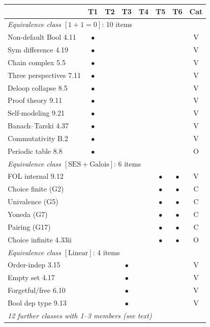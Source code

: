 \begin{center}
\scriptsize
\begin{tabular}{l|cccccc|c}
 & T1 & T2 & T3 & T4 & T5 & T6 & Cat \\
\hline
\multicolumn{8}{l}{\emph{Equivalence class}
  $[1{+}1{=}0]$: 10 items} \\
Non-default Bool 4.11 &
  $\bullet$ & & & & & & V \\
Sym difference 4.19 &
  $\bullet$ & & & & & & V \\
Chain complex 5.5 &
  $\bullet$ & & & & & & V \\
Three perspectives 7.11 &
  $\bullet$ & & & & & & V \\
Deloop collapse 8.5 &
  $\bullet$ & & & & & & V \\
Proof theory 9.11 &
  $\bullet$ & & & & & & V \\
Self-modeling 9.21 &
  $\bullet$ & & & & & & V \\
Banach--Tarski 4.37 &
  $\bullet$ & & & & & & V \\
Commutativity B.2 &
  $\bullet$ & & & & & & V \\
Periodic table 8.8 &
  $\bullet$ & & & & & & O \\[4pt]
\multicolumn{8}{l}{\emph{Equivalence class}
  $[\mathrm{SES} + \mathrm{Galois}]$: 6 items} \\
FOL internal 9.12 &
  & & & & $\bullet$ & $\bullet$ & V \\
Choice finite (G2) &
  & & & & $\bullet$ & $\bullet$ & C \\
Univalence (G5) &
  & & & & $\bullet$ & $\bullet$ & C \\
Yoneda (G7) &
  & & & & $\bullet$ & $\bullet$ & C \\
Pairing (G17) &
  & & & & $\bullet$ & $\bullet$ & C \\
Choice infinite 4.33ii &
  & & & & $\bullet$ & $\bullet$ & O \\[4pt]
\multicolumn{8}{l}{\emph{Equivalence class}
  $[\mathrm{Linear}]$: 4 items} \\
Order-indep 3.15 &
  & & $\bullet$ & & & & V \\
Empty set 4.17 &
  & & $\bullet$ & & & & V \\
Forgetful/free 6.10 &
  & & $\bullet$ & & & & V \\
Bool dep type 9.13 &
  & & $\bullet$ & & & & V \\[4pt]
\multicolumn{8}{l}{\emph{12 further classes with
  1--3 members (see text)}}
\end{tabular}
\end{center}

